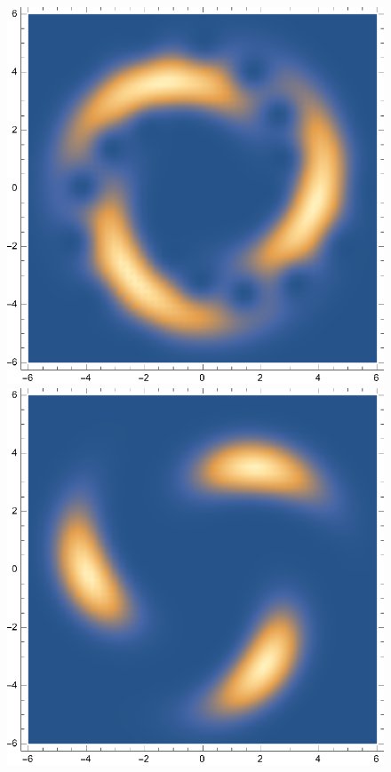 \documentclass{article}
\theoremstyle{definition}
\begin{document}
\begin{enumerate}[label=\alph*)]
\begin{figure}[!htb]
\begin{minipage}{.24\textwidth}
	\end{minipage}
	\begin{minipage}{.24\textwidth}
  	\centering
  	\includegraphics[width=.7\linewidth]{figures/5-40.eps}
	\end{minipage}
	\begin{minipage}{.24\textwidth}
  	\centering
  	\includegraphics[width=.7\linewidth]{figures/5-44.eps}
	\end{minipage} \\ 
	\begin{minipage}{.24\textwidth}
  	\centering

\end{minipage}
\end{figure}
\end{enumerate}
\end{document}
